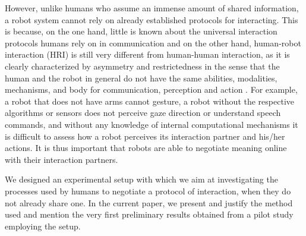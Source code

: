 However, unlike humans who assume an immense amount of shared information, a robot system cannot rely on already established protocols for interacting. This is because, on the one hand, little is known about the universal interaction protocols humans rely on in communication and on the other hand, human-robot interaction (HRI) is still very different from human-human interaction, as it is clearly characterized by asymmetry and restrictedness in the sense that the human and the robot in general do not have the same abilities, modalities, mechanisms, and body for communication, perception and action \cite{lohse2010investigating}. For example, a robot that does not have arms cannot gesture, a robot without the respective algorithms or sensors does not perceive gaze direction or understand speech commands, and without any knowledge of internal computational mechanisms it is difficult to assess how a robot perceives its interaction partner and his/her actions. It is thus important that robots are able to negotiate meaning online with their interaction partners.


We designed an experimental setup with which we aim at investigating the processes used by humans to negotiate a protocol of interaction, when they do not already share one. In the current paper, we present and justify the method used and mention the very first preliminary results obtained from a pilot study employing the setup.

